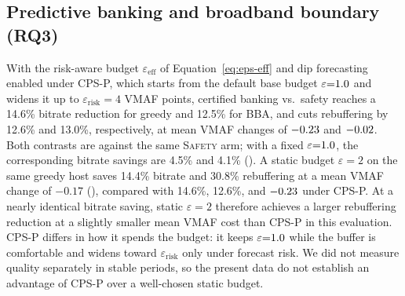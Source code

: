 \begin{cps@table}
    \caption{Paired arms on primary \mbox{5G} test traces (\(\CPSepisodes\) episodes, \(\varepsilon{=}\CPSepsilon\), \(\alpha{=}\CPSalpha\)). Reb.\ is mean rebuffering per episode; Cover.\ is empirical conformal coverage; Interv.\ is shield intervention rate.}
    \label{tab:cps:full}
    \centering
    \evaltable{}
\end{cps@table}

\subsection{Predictive banking and broadband boundary (RQ3)}
\label{sec:eval:improved}

With the risk-aware budget \(\varepsilon_{\mathrm{eff}}\) of Equation~\eqref{eq:eps-eff} and dip forecasting enabled under CPS-P, which starts from the default base budget \(\varepsilon{=}\CPSepsilon\) and widens it up to \(\varepsilon_{\mathrm{risk}}{=}4\) VMAF points, certified banking vs.\ safety reaches a 14.6\% bitrate reduction for greedy and 12.5\% for BBA, and cuts rebuffering by 12.6\% and 13.0\%, respectively, at mean VMAF changes of \(-0.23\) and \(-0.02\). Both contrasts are against the same \textsc{Safety} arm; with a fixed \(\varepsilon{=}\CPSepsilon\), the corresponding bitrate savings are 4.5\% and 4.1\% ().
A static budget \(\varepsilon{=}2\) on the same greedy host saves 14.4\% bitrate and 30.8\% rebuffering at a mean VMAF change of \(-0.17\) (), compared with 14.6\%, 12.6\%, and \(-0.23\) under CPS-P.
At a nearly identical bitrate saving, static \(\varepsilon{=}2\) therefore achieves a larger rebuffering reduction at a slightly smaller mean VMAF cost than CPS-P in this evaluation.
CPS-P differs in how it spends the budget: it keeps \(\varepsilon{=}\CPSepsilon\) while the buffer is comfortable and widens toward \(\varepsilon_{\mathrm{risk}}\) only under forecast risk. We did not measure quality separately in stable periods, so the present data do not establish an advantage of CPS-P over a well-chosen static budget.

